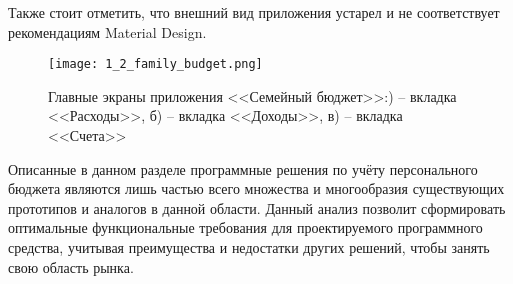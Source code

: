Также стоит отметить, что внешний вид приложения устарел и не соответствует рекомендациям Material Design.

\begin{figure}
    \centering
    \texttt{[image: 1\_2\_family\_budget.png]}
    \caption{Главные экраны приложения <<Семейный бюджет>>:) -- вкладка <<Расходы>>, б) -- вкладка <<Доходы>>, в) -- вкладка <<Счета>>}
    \label{fig:analysis:analogues:family_budget}
\end{figure}


Описанные в данном разделе программные решения по учёту персонального бюджета являются лишь частью всего множества и многообразия существующих прототипов и аналогов в данной области.
Данный анализ позволит сформировать оптимальные функциональные требования для проектируемого программного средства, учитывая преимущества и недостатки других решений, чтобы занять свою область рынка.